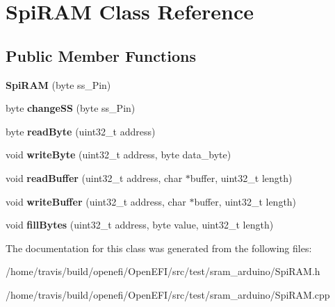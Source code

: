 \hypertarget{classSpiRAM}{}\section{Spi\+R\+AM Class Reference}
\label{classSpiRAM}
\subsection*{Public Member Functions}
\begin{DoxyCompactItemize}
\item 
\mbox{\label{classSpiRAM_a43ad04217dcbeb1d4fbdca0b4b42893b}} 
{\bfseries Spi\+R\+AM} (byte ss\+\_\+\+Pin)
\item 
\mbox{\label{classSpiRAM_a2ed8e3f5609a11e06c1e20fac142dc50}} 
byte {\bfseries change\+SS} (byte ss\+\_\+\+Pin)
\item 
\mbox{\label{classSpiRAM_a38d7ea7c119802bbbc262c8f3fda8874}} 
byte {\bfseries read\+Byte} (uint32\+\_\+t address)
\item 
\mbox{\label{classSpiRAM_a1655f164c2f0d97339cf7681da982f84}} 
void {\bfseries write\+Byte} (uint32\+\_\+t address, byte data\+\_\+byte)
\item 
\mbox{\label{classSpiRAM_af32286caa4979214895357042089eb55}} 
void {\bfseries read\+Buffer} (uint32\+\_\+t address, char $\ast$buffer, uint32\+\_\+t length)
\item 
\mbox{\label{classSpiRAM_a22b9d759991b732ac1de5908482c7c99}} 
void {\bfseries write\+Buffer} (uint32\+\_\+t address, char $\ast$buffer, uint32\+\_\+t length)
\item 
\mbox{\label{classSpiRAM_af34fe208f2f04f8328ad1fb39c884e05}} 
void {\bfseries fill\+Bytes} (uint32\+\_\+t address, byte value, uint32\+\_\+t length)
\end{DoxyCompactItemize}


The documentation for this class was generated from the following files\+:\begin{DoxyCompactItemize}
\item 
/home/travis/build/openefi/\+Open\+E\+F\+I/src/test/sram\+\_\+arduino/Spi\+R\+A\+M.\+h\item 
/home/travis/build/openefi/\+Open\+E\+F\+I/src/test/sram\+\_\+arduino/Spi\+R\+A\+M.\+cpp\end{DoxyCompactItemize}
